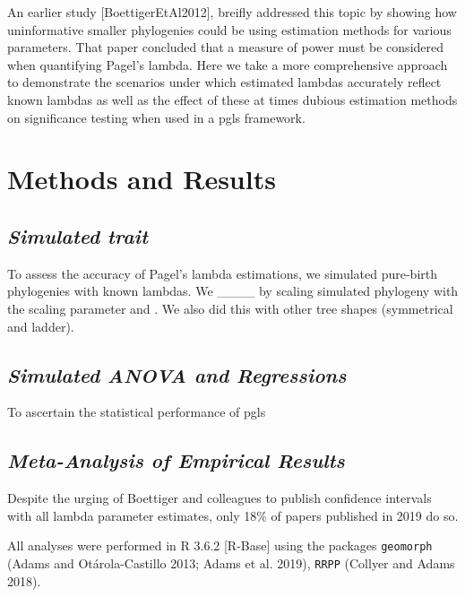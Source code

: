\documentclass[]{article}
\begin{document}
An earlier study {[}BoettigerEtAl2012{]}, breifly addressed this topic
by showing how uninformative smaller phylogenies could be using
estimation methods for various parameters. That paper concluded that a
measure of power must be considered when quantifying Pagel's lambda.
Here we take a more comprehensive approach to demonstrate the scenarios
under which estimated lambdas accurately reflect known lambdas as well
as the effect of these at times dubious estimation methods on
significance testing when used in a pgls framework.

\section{Methods and Results}\label{methods-and-results}

\subsection{\texorpdfstring{\emph{Simulated
trait}}{Simulated trait}}\label{simulated-trait}

To assess the accuracy of Pagel's lambda estimations, we simulated
pure-birth phylogenies with known lambdas. We \_\_\_\_ by scaling
simulated phylogeny with the scaling parameter and . We also did this
with other tree shapes (symmetrical and ladder). \hfill\break

\subsection{\texorpdfstring{\emph{Simulated ANOVA and
Regressions}}{Simulated ANOVA and Regressions}}\label{simulated-anova-and-regressions}

To ascertain the statistical performance of pgls \hfill\break

\subsection{\texorpdfstring{\emph{Meta-Analysis of Empirical
Results}}{Meta-Analysis of Empirical Results}}\label{meta-analysis-of-empirical-results}

Despite the urging of Boettiger and colleagues to publish confidence
intervals with all lambda parameter estimates, only 18\% of papers
published in 2019 do so. \hfill\break

All analyses were performed in R 3.6.2 {[}R-Base{]} using the packages
\texttt{geomorph} (Adams and Otárola-Castillo 2013; Adams et al. 2019),
\texttt{RRPP} (Collyer and Adams 2018). \hfill\break
\end{document}
